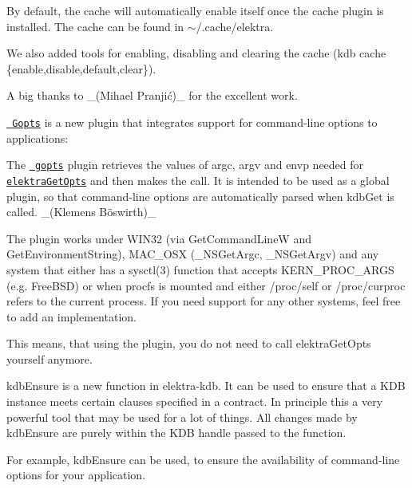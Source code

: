 By default, the cache will automatically enable itself once the {\ttfamily cache} plugin is installed. The cache can be found in {\ttfamily $\sim$/.cache/elektra}.

We also added tools for enabling, disabling and clearing the cache ({\ttfamily kdb cache \{enable,disable,default,clear\}}).

A big thanks to \+\_\+(Mihael Pranjić)\+\_\+ for the excellent work.

\href{https://www.libelektra.org/plugins/gopts}{\texttt{ Gopts}} is a new plugin that integrates support for command-\/line options to applications\+:


\begin{DoxyItemize}
\item The \href{https://www.libelektra.org/plugins/gopts}{\texttt{ gopts}} plugin retrieves the values of {\ttfamily argc}, {\ttfamily argv} and {\ttfamily envp} needed for \href{https://www.libelektra.org/tutorials/command-line-options}{\texttt{ {\ttfamily elektra\+Get\+Opts}}} and then makes the call. It is intended to be used as a global plugin, so that command-\/line options are automatically parsed when {\ttfamily kdb\+Get} is called. \+\_\+(Klemens Böswirth)\+\_\+
\item The plugin works under W\+I\+N32 (via {\ttfamily Get\+Command\+LineW} and {\ttfamily Get\+Environment\+String}), M\+A\+C\+\_\+\+O\+SX ({\ttfamily \+\_\+\+N\+S\+Get\+Argc}, {\ttfamily \+\_\+\+N\+S\+Get\+Argv}) and any system that either has a {\ttfamily sysctl(3)} function that accepts {\ttfamily K\+E\+R\+N\+\_\+\+P\+R\+O\+C\+\_\+\+A\+R\+GS} (e.\+g. Free\+B\+SD) or when {\ttfamily procfs} is mounted and either {\ttfamily /proc/self} or {\ttfamily /proc/curproc} refers to the current process. If you need support for any other systems, feel free to add an implementation.
\end{DoxyItemize}

This means, that using the plugin, you do not need to call {\ttfamily elektra\+Get\+Opts} yourself anymore.

{\ttfamily kdb\+Ensure} is a new function in {\ttfamily elektra-\/kdb}. It can be used to ensure that a K\+DB instance meets certain clauses specified in a contract. In principle this a very powerful tool that may be used for a lot of things. All changes made by {\ttfamily kdb\+Ensure} are purely within the K\+DB handle passed to the function.

For example, {\ttfamily kdb\+Ensure} can be used, to ensure the availability of command-\/line options for your application.

